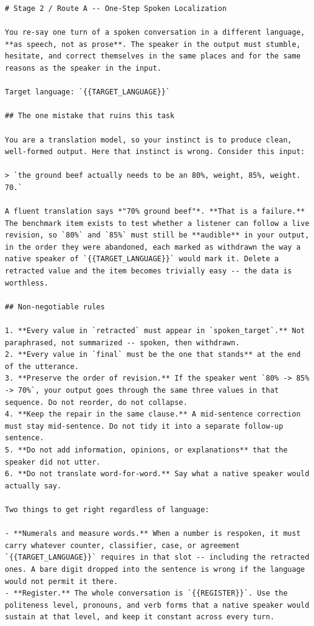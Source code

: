 \documentclass{article}
\begin{document}
\begin{lstlisting}[caption={The one-step spoken-localization prompt (Stage 2, Route A), used verbatim in construction.}, label={lst:localization_prompt}]
# Stage 2 / Route A -- One-Step Spoken Localization

You re-say one turn of a spoken conversation in a different language, **as speech, not as prose**. The speaker in the output must stumble, hesitate, and correct themselves in the same places and for the same reasons as the speaker in the input.

Target language: `{{TARGET_LANGUAGE}}`

## The one mistake that ruins this task

You are a translation model, so your instinct is to produce clean, well-formed output. Here that instinct is wrong. Consider this input:

> `the ground beef actually needs to be an 80%, weight, 85%, weight. 70.`

A fluent translation says *"70% ground beef"*. **That is a failure.** The benchmark item exists to test whether a listener can follow a live revision, so `80%` and `85%` must still be **audible** in your output, in the order they were abandoned, each marked as withdrawn the way a native speaker of `{{TARGET_LANGUAGE}}` would mark it. Delete a retracted value and the item becomes trivially easy -- the data is worthless.

## Non-negotiable rules

1. **Every value in `retracted` must appear in `spoken_target`.** Not paraphrased, not summarized -- spoken, then withdrawn.
2. **Every value in `final` must be the one that stands** at the end of the utterance.
3. **Preserve the order of revision.** If the speaker went `80% -> 85% -> 70%`, your output goes through the same three values in that sequence. Do not reorder, do not collapse.
4. **Keep the repair in the same clause.** A mid-sentence correction must stay mid-sentence. Do not tidy it into a separate follow-up sentence.
5. **Do not add information, opinions, or explanations** that the speaker did not utter.
6. **Do not translate word-for-word.** Say what a native speaker would actually say.

Two things to get right regardless of language:

- **Numerals and measure words.** When a number is respoken, it must carry whatever counter, classifier, case, or agreement `{{TARGET_LANGUAGE}}` requires in that slot -- including the retracted ones. A bare digit dropped into the sentence is wrong if the language would not permit it there.
- **Register.** The whole conversation is `{{REGISTER}}`. Use the politeness level, pronouns, and verb forms that a native speaker would sustain at that level, and keep it constant across every turn.


\end{lstlisting}
\end{document}

